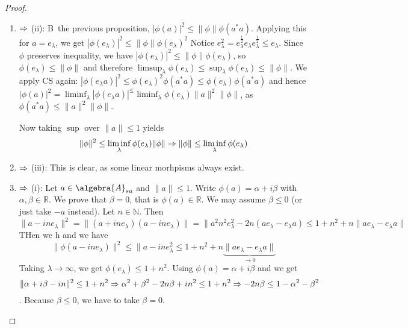 \documentclass[a4paper]{article}
\begin{document}
\begin{proof}~
	\begin{enumerate}
		\item $\Rightarrow$ (ii): B\ the previous proposition, $|\phi(a)|^2 \leq \|\phi\| \phi(a^* a)$.
		Applying this for $a = e_\lambda$, we get $|\phi(e_\lambda)|^2 \leq \|\phi\| \phi(e_\lambda)^2$
		Notice $e_\lambda^2 = e_\lambda^\frac{1}{2} e_\lambda e_\lambda^\frac{1}{2} \leq e_\lambda$.
		Since $\phi$ preserves inequality, we have $|\phi(e_\lambda)|^2 \leq \|\phi\| \phi(e_\lambda)$, so $\phi(e_\lambda) \leq \|\phi\|$ and therefore $\limsup_{\lambda} \phi(e_\lambda) \leq \sup_\lambda \phi(e_\lambda) \leq \|\phi\|$.
		We apply CS again: $|\phi(e_\lambda a)|^2 \leq \phi(e_\lambda)^2 \phi(a^* a) \leq \phi(e_\lambda) \phi(a^* a)$ and hence $|\phi(a)|^2 = \liminf_\lambda |\phi(e_\lambda a)|^ \leq \liminf_\lambda \phi(e_\lambda)  \|a\|^2 \|\phi\|$, as$\phi(a^* a) \leq \|a\|^2 \|\phi\|$.

		Now taking $\sup$ over $\|a\| \leq 1$ yields
		\begin{equation*}
			\|\phi\|^2 \leq \liminf_{\lambda} \phi(e_\lambda) \|\phi\| \then \|\phi\| \leq \liminf_\lambda \phi(e_\lambda)
		\end{equation*}
		\item $\Rightarrow$ (iii): This is clear, as some linear morhpisms always exist.
		\item $\Rightarrow$ (i): Let $a \in \algebra{A}_{sa}$ and $\|a\| \leq 1$. 
		Write $\phi(a) = \alpha + i \beta$ with $\alpha, \beta \in \mathds{R}$. 
		We prove that $\beta = 0$, that is $\phi(a) \in \mathds{R}$. 
		We may assume $\beta \leq 0$ (or just take $-a$ instead).
		Let $n \in \mathds{N}$. Then 
		\begin{equation*}
			\| a - i n e_\lambda \|^2 = \| (a + i n e_\lambda) (a - i n e_\lambda)\|= \|a^2 n^2 e_\lambda^2 - 2n(a e_\lambda - e_\lambda a) \leq 1 + n^2 + n \| a e_\lambda - e_\lambda a \| 
		\end{equation*}THen we h
		and we have
		\begin{equation*}
			\|\phi(a - i n e_\lambda)\|^2 \leq \|a - i n e_\lambda^2 \leq 1 + n^2 + n \underbrace{\|a e_\lambda - e_\lambda a\|}_{\to 0}
		\end{equation*}
		Taking $\lambda \to \infty$, we get $\phi(e_\lambda) \leq 1 + n^2$.
		Using $\phi(a) = \alpha + i \beta$ and we get 
		\begin{equation*}
			\|\alpha + i \beta - in\|^2 \leq 1 + n^2 \Rightarrow \alpha^2 + \beta^2 - 2 n \beta + i n^2 \leq 1 + n^2 \Rightarrow - 2 n\beta \leq 1- \alpha^2 - \beta^2
		\end{equation*}.
		Because $\beta \leq 0$, we have to take $\beta = 0$.


\end{enumerate}
\end{proof}
\end{document}
